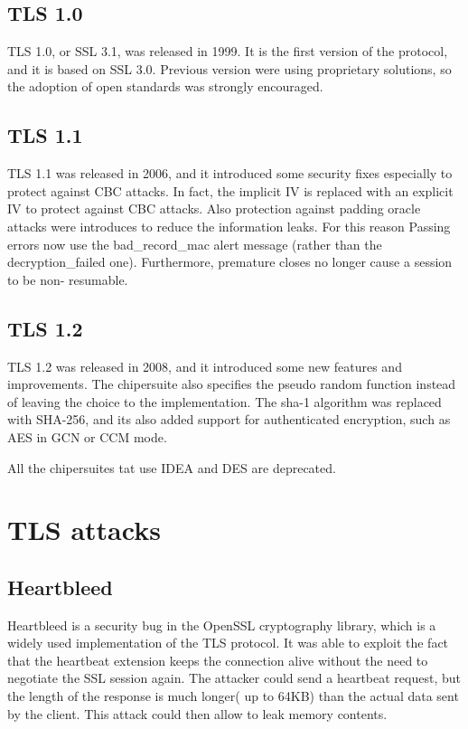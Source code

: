 \subsection{TLS 1.0}
TLS 1.0, or SSL 3.1, was released in 1999. It is the first version of
the protocol, and it is based on SSL 3.0. Previous version were using
proprietary solutions, so the adoption of open standards was strongly
encouraged.

\subsection{TLS 1.1}
TLS 1.1 was released in 2006, and it introduced some security fixes
especially to protect against CBC attacks. In fact, the implicit
IV is replaced with an explicit IV to protect against CBC attacks.
Also protection against padding oracle attacks were introduces to
reduce the information leaks. For this reason Passing errors now use
the bad\_record\_mac alert message (rather than the decryption\_failed
one). Furthermore, premature closes no longer cause a session to be non-
resumable.

\subsection{TLS 1.2}
TLS 1.2 was released in 2008, and it introduced some new features and 
improvements. The chipersuite also specifies the pseudo random
function instead of leaving the choice to the implementation. The
sha-1 algorithm was replaced with SHA-256, and its also added support
for authenticated encryption, such as AES in GCN or CCM mode.

All the chipersuites tat use IDEA and DES are deprecated.

\section{TLS attacks}
\subsection{Heartbleed}
Heartbleed is a security bug in the OpenSSL cryptography library,
which is a widely used implementation of the TLS protocol. It was able
to exploit the fact that the heartbeat extension keeps the connection
alive without the need to negotiate the SSL session again. The
attacker could send a heartbeat request, but the length of the 
response is much longer( up to 64KB) than the actual data sent by the
client. This attack could then allow to leak memory contents.

